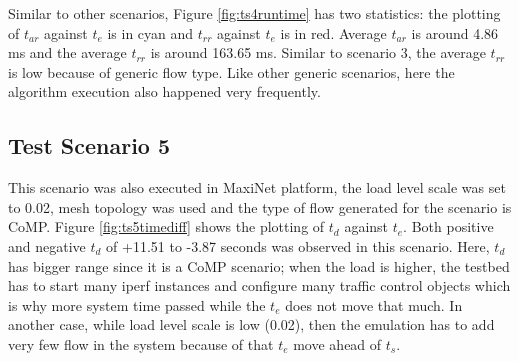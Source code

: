 \begin{figure}[H]
	\begin{center}
	\end{center}
\end{figure}

Similar to other scenarios, Figure \ref{fig:ts4runtime} has two statistics: the plotting of $t_{ar}$ against $t_e$ is in cyan and $t_{rr}$ against $t_e$ is in red. Average $t_{ar}$ is around 4.86 ms and the average $t_{rr}$ is around 163.65 ms. Similar to scenario 3, the average $t_{rr}$ is low because of generic flow type. Like other generic scenarios, here the algorithm execution also happened very frequently.

\subsection{Test Scenario 5}
This scenario was also executed in MaxiNet platform, the load level scale was set to 0.02, mesh topology was used and the type of flow generated for the scenario is CoMP. Figure \ref{fig:ts5timediff} shows the plotting of $t_d$ against $t_e$. Both positive and negative $t_d$ of +11.51 to -3.87 seconds was observed in this scenario. Here, $t_d$ has bigger range since it is a CoMP scenario; when the load is higher, the testbed has to start many iperf instances and configure many traffic control objects which is why more system time passed while the $t_e$ does not move that much. In another case, while load level scale is low (0.02), then the emulation has to add very few flow in the system because of that $t_e$ move ahead of $t_s$.

\begin{figure}[H]
	\begin{center}
	\end{center}
\end{figure}

